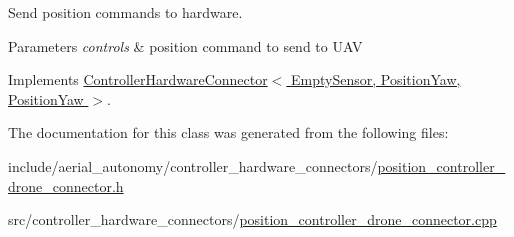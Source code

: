 Send position commands to hardware. 


\begin{DoxyParams}{Parameters}
{\em controls} & position command to send to U\-A\-V \\
\hline
\end{DoxyParams}


Implements \hyperlink{classControllerHardwareConnector_a5fc86156d5c747aba36497732962d6d0}{Controller\-Hardware\-Connector$<$ Empty\-Sensor, Position\-Yaw, Position\-Yaw $>$}.



The documentation for this class was generated from the following files\-:\begin{DoxyCompactItemize}
\item 
include/aerial\-\_\-autonomy/controller\-\_\-hardware\-\_\-connectors/\hyperlink{position__controller__drone__connector_8h}{position\-\_\-controller\-\_\-drone\-\_\-connector.\-h}\item 
src/controller\-\_\-hardware\-\_\-connectors/\hyperlink{position__controller__drone__connector_8cpp}{position\-\_\-controller\-\_\-drone\-\_\-connector.\-cpp}\end{DoxyCompactItemize}

